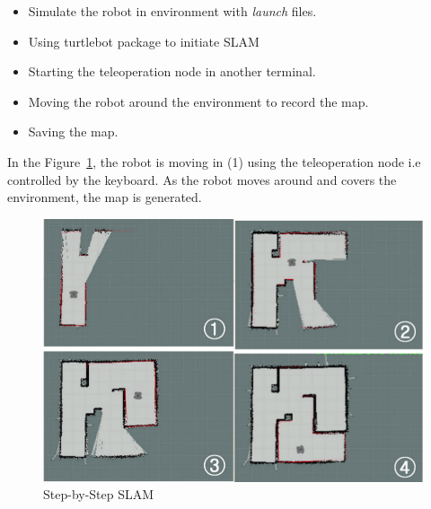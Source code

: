 \begin{itemize}
    \item Simulate the robot in environment with \textit{launch} files.
    \item Using turtlebot package to initiate SLAM 
    \item Starting the teleoperation node in another terminal.
    \item Moving the robot around the environment to record the map.
    \item Saving the map.
\end{itemize}

In the Figure~\ref{fig:Step-by-StepSLAM}, the robot is moving in (1) using the teleoperation node i.e controlled by the keyboard.
As the robot moves around and covers the environment, the map is generated.

\begin{figure}[th]
    \centering
    \includegraphics[width=\textwidth]{Figures/SLAM.png}
    \decoRule
    \caption[]{Step-by-Step SLAM}
    \label{fig:Step-by-StepSLAM}
\end{figure}

